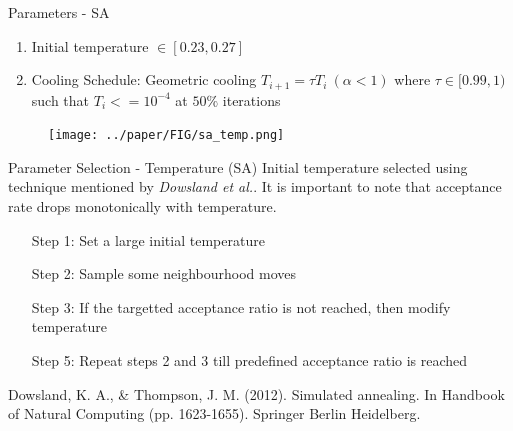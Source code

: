 \documentclass{beamer}
\begin{document}
\begin{frame}[t]{Parameters - SA}
    \begin{enumerate}
        \item Initial temperature $\in [0.23, 0.27]$
        \item Cooling Schedule: Geometric cooling $T_{i+1} = \tau T_{i}~ (\alpha < 1)$ where $\tau \in [0.99, 1)$ such that $T_i <= 10^{-4}$ at $50\%$ iterations
    \end{enumerate}
    \begin{figure}
        \centering
        \texttt{[image: ../paper/FIG/sa\_temp.png]}
    \end{figure}

\end{frame}

\begin{frame}{Parameter Selection - Temperature (SA)}
    Initial temperature selected using technique mentioned by \textit{Dowsland et al.}. It is important to note that acceptance rate drops monotonically with temperature. 
    \vspace*{.5cm}
    \begin{enumerate}
        \item [Step 1:] Set a large initial temperature
        \item [Step 2:] Sample some neighbourhood moves
        \item [Step 3:] If the targetted acceptance ratio is not reached, then modify temperature 
        \item [Step 5:] Repeat steps 2 and 3 till predefined acceptance ratio is reached 
    \end{enumerate}
    {\tiny Dowsland, K. A., \& Thompson, J. M. (2012). Simulated annealing. In Handbook of Natural Computing (pp. 1623-1655). Springer Berlin Heidelberg. }
\end{frame}
\end{document}
